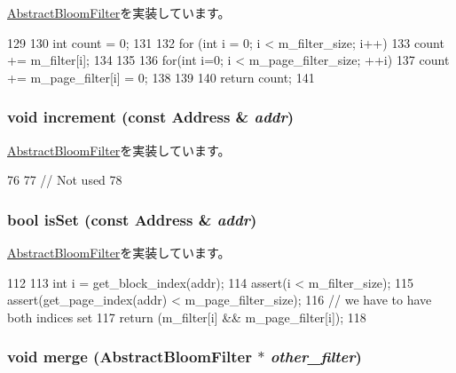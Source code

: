 \hyperlink{classAbstractBloomFilter_a25ea5e1ef3d4911226f37649b6efed22}{AbstractBloomFilter}を実装しています。


\begin{DoxyCode}
129 {
130     int count = 0;
131 
132     for (int i = 0; i < m_filter_size; i++) {
133         count += m_filter[i];
134     }
135 
136     for(int i=0; i < m_page_filter_size; ++i) {
137         count += m_page_filter[i] = 0;
138     }
139 
140     return count;
141 }
\end{DoxyCode}
\hypertarget{classMultiGrainBloomFilter_a3e860ad851b771ac3b6eeb1716eb56bc}{
\subsubsection[{increment}]{\setlength{\rightskip}{0pt plus 5cm}void increment (const {\bf Address} \& {\em addr})}}
\label{classMultiGrainBloomFilter_a3e860ad851b771ac3b6eeb1716eb56bc}


\hyperlink{classAbstractBloomFilter_af795f7fdeff0174e914ed1d792ffe4ff}{AbstractBloomFilter}を実装しています。


\begin{DoxyCode}
76 {
77     // Not used
78 }
\end{DoxyCode}
\hypertarget{classMultiGrainBloomFilter_a4200ee289c3d941a4b209c4788f8087c}{
\subsubsection[{isSet}]{\setlength{\rightskip}{0pt plus 5cm}bool isSet (const {\bf Address} \& {\em addr})}}
\label{classMultiGrainBloomFilter_a4200ee289c3d941a4b209c4788f8087c}


\hyperlink{classAbstractBloomFilter_aa1b69d102655f8c5879b3df95eb205dc}{AbstractBloomFilter}を実装しています。


\begin{DoxyCode}
112 {
113     int i = get_block_index(addr);
114     assert(i < m_filter_size);
115     assert(get_page_index(addr) < m_page_filter_size);
116     // we have to have both indices set
117     return (m_filter[i] && m_page_filter[i]);
118 }
\end{DoxyCode}
\hypertarget{classMultiGrainBloomFilter_a4091f5f95de040d4e0ae5bd86817b13c}{
\subsubsection[{merge}]{\setlength{\rightskip}{0pt plus 5cm}void merge ({\bf AbstractBloomFilter} $\ast$ {\em other\_\-filter})}}
\label{classMultiGrainBloomFilter_a4091f5f95de040d4e0ae5bd86817b13c}



